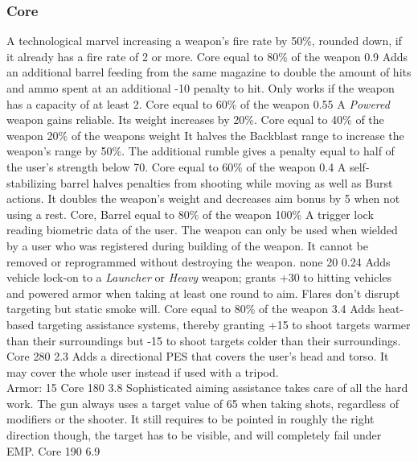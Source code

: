 \subsubsection{Core}
\vspace{8mm}
\begin{multicols}{2}
    {A technological marvel increasing a weapon's fire rate by 50\%,
        rounded down, if it already has a fire rate of 2 or more.}
    {Core}
    {equal to 80\% of the weapon}
    {0.9}
    {Adds an additional barrel feeding from the same magazine
        to double the amount of hits and ammo spent at an additional -10 penalty to hit.
        Only works if the weapon has a capacity of at least 2.}
    {Core}
    {equal to 60\% of the weapon}
    {0.55}
    {A \emph{Powered} weapon gains reliable.
        Its weight increases by 20\%.}
    {Core}
    {equal to 40\% of the weapon}
    {20\% of the weapons weight} %
    {It halves the Backblast range to increase the weapon's range by 50\%.
        The additional rumble gives a penalty equal to half of the user's strength below 70.}
    {Core}
    {equal to 60\% of the weapon}
    {0.4}
    {A self-stabilizing barrel halves penalties from shooting while moving as well as Burst actions.
        It doubles the weapon's weight and decreases aim bonus by 5 when not using a rest.}
    {Core, Barrel}
    {equal to 80\% of the weapon}
    {100\%} %
    {A trigger lock reading biometric data of the user.
        The weapon can only be used when wielded by a user
        who was registered during building of the weapon.
        It cannot be removed or reprogrammed without destroying the weapon.}
    {none}
    {20}
    {0.24}
    {Adds vehicle lock-on to a \emph{Launcher} or \emph{Heavy} weapon;
        grants +30 to hitting vehicles and powered armor
        when taking at least one round to aim.
        Flares don't disrupt targeting but static smoke will.}
    {Core}
    {equal to 80\% of the weapon}
    {3.4}
    {Adds heat-based targeting assistance systems,
        thereby granting +15 to shoot targets warmer than their surroundings
        but -15 to shoot targets colder than their surroundings.}
    {Core}
    {280}
    {2.3}
    {Adds a directional PES that covers the user's head and torso.
	It may cover the whole user instead if used with a tripod.\\
	Armor: 15}
    {Core}
    {180}
    {3.8}
    {Sophisticated aiming assistance takes care of all the hard work.
        The gun always uses a target value of 65 when taking shots,
        regardless of modifiers or the shooter.
        It still requires to be pointed in roughly the right direction though,
        the target has to be visible,
        and will completely fail under EMP.
    }
     {Core}
     {190}
     {6.9}
\end{multicols}

